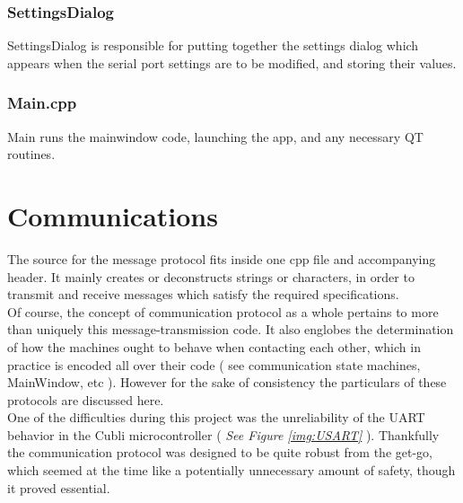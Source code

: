 \subsubsection{SettingsDialog}

SettingsDialog is responsible for putting together the settings dialog which appears when the serial port settings are to be modified, and storing their values.

\subsubsection{Main.cpp}

Main runs the mainwindow code, launching the app, and any necessary QT routines.

\section{Communications}

The source for the message protocol fits inside one cpp file and accompanying header. It mainly creates or deconstructs strings or characters, in order to transmit and receive messages which satisfy the required specifications.\\

Of course, the concept of communication protocol as a whole pertains to more than uniquely this message-transmission code. It also englobes the determination of how the machines ought to behave when contacting each other, which in practice is encoded all over their code ( see communication state machines, MainWindow, etc ). However for the sake of consistency the particulars of these protocols are discussed here.\\

One of the difficulties during this project was the unreliability of the UART behavior in the Cubli microcontroller ( \textit{See Figure \ref{img:USART}} ). Thankfully the communication protocol was designed to be quite robust from the get-go, which seemed at the time like a potentially unnecessary amount of safety, though it proved essential.

